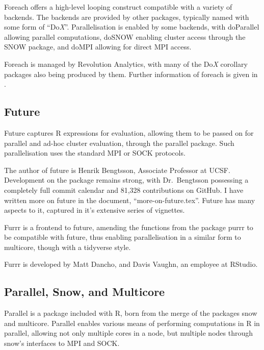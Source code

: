 \documentclass[10pt,a4paper]{article}
\begin{document}
Foreach offers a high-level looping construct compatible with a
variety of backends\cite{microsoft20}. The backends are provided by
other packages, typically named with some form of ``Do\textit{X}''.
Parallelisation is enabled by some backends, with doParallel allowing
parallel computations\cite{corporation19}, doSNOW enabling cluster
access through the SNOW package\cite{dosnow19}, and doMPI allowing for
direct MPI access\cite{weston17}.

Foreach is managed by Revolution Analytics, with many of the
Do\textit{X} corollary packages also being produced by them. Further
information of foreach is given in \textcite{weston19:_using}.

\subsection{Future}
\label{sec:future-furrr}

Future captures R expressions for evaluation, allowing them to be
passed on for parallel and ad-hoc cluster evaluation, through the
parallel package\cite{bengtsson20}. Such parallelisation uses the
standard MPI or SOCK protocols.

The author of future is Henrik Bengtsson, Associate Professor at UCSF.
Development on the package remains strong, with Dr.~Bengtsson
possessing a completely full commit calendar and 81,328 contributions
on GitHub. I have written more on future in the document,
``more-on-future.tex''. Future has many aspects to it, captured in
it's extensive series of
vignettes\cite{bengtsson20:_futur_r}\cite{bengtsson20:_futur_r2}\cite{bengtsson20:_futur_r3}\cite{bengtsson20:_futur_r4}\cite{bengtsson20:_futur_r5}\cite{bengtsson20:_futur_r6}.

Furrr is a frontend to future, amending the functions from the package
purrr to be compatible with future, thus enabling parallelisation in a
similar form to multicore, though with a tidyverse
style\cite{vaughan18}.

Furrr is developed by Matt Dancho, and Davis Vaughn, an employee at
RStudio.

\subsection{Parallel, Snow, and Multicore}
\label{sec:parall-snow-mult}
Parallel is a package included with R, born from the merge of the
packages snow and multicore\cite{core:_packag}. Parallel enables
various means of performing computations in R in parallel, allowing
not only multiple cores in a node, but multiple nodes through snow's
interfaces to MPI and SOCK\cite{tierney18}.
\end{document}

